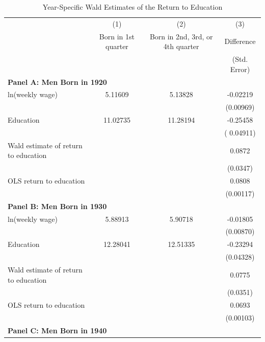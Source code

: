 \documentclass[11pt]{article}
\begin{document}
\begin{table}[htbp]
\centering
\caption{Year-Specific Wald Estimates of the Return to Education}
\label{tab:wald_year_specific}

\begin{tabular}{lccc}
\toprule
& (1) & (2) & (3) \\
& Born in 1st quarter
& Born in 2nd, 3rd, or 4th quarter
& Difference \\
& & & (Std. Error) \\
\midrule

\multicolumn{4}{l}{\textbf{Panel A: Men Born in 1920}} \\[0.5em]

ln(weekly wage)
&   5.11609  
&   5.13828
&   -0.02219 \\
& & & (0.00969) \\[0.6em]

Education
& 11.02735 
& 11.28194 
& -0.25458 \\
& & & ( 0.04911) \\[0.6em]

Wald estimate of return to education
& & & 0.0872 \\
& & & (0.0347) \\[0.6em]

OLS return to education
& & & 0.0808 \\
& & & (0.00117) \\

\midrule

\multicolumn{4}{l}{\textbf{Panel B: Men Born in 1930}} \\[0.5em]

ln(weekly wage)
& 5.88913 
& 5.90718
& -0.01805 \\
& & & (0.00870) \\[0.6em]

Education
& 12.28041
& 12.51335
& -0.23294  \\
& & & (0.04328) \\[0.6em]

Wald estimate of return to education
& & & 0.0775 \\
& & & (0.0351) \\[0.6em]

OLS return to education
& & & 0.0693 \\
& & & (0.00103) \\

\midrule

\multicolumn{4}{l}{\textbf{Panel C: Men Born in 1940}} \\[0.5em]


\end{tabular}
\end{table}
\end{document}
